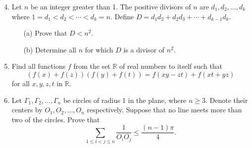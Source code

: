 \documentclass[12pt]{article}
\begin{document}
\vspace*{.3in}

\begin{enumerate}
\setcounter{enumi}{3}
\item %
Let $n$ be an integer greater than 1. The positive divisors of $n$ are
$d_1, d_2, \dots, d_k$ where $1 = d_1 < d_2 < \cdots <d_k = n$.
Define $D = d_1d_2 + d_2d_3 + \cdots + d_{k-1}d_k$.
\begin{enumerate}
\item[(a)] Prove that $D<n^2$.
\item[(b)] Determine all $n$ for which $D$ is a divisor of $n^2$.
\end{enumerate}

\item %
Find all functions $f$ from the set $\mathbb{R}$ of real numbers to
itself such that
\[
(f(x) + f(z))(f(y) + f(t)) = f(xy-zt) + f(xt+yz)
\]
for all $x,y,z,t$ in $\mathbb{R}$.

\item %
Let $\Gamma_1, \Gamma_2, \dots, \Gamma_n$ be circles of radius 1 in the
plane, where $n \geq 3$. Denote their centers by $O_1, O_2, \dots, O_n$
respectively. Suppose that no line meets more than two of the circles.
Prove that
\[
\sum_{1 \leq i < j \leq n} \frac{1}{O_iO_j} \leq \frac{(n-1)\pi}{4}.
\]

\end{enumerate}
\end{document}
